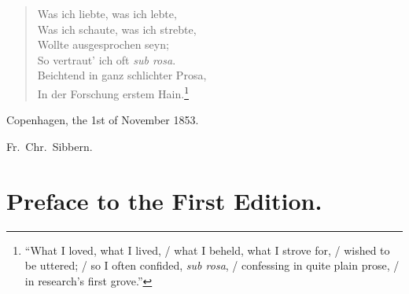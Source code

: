 \documentclass[12pt,a4paper]{book}
\begin{document}
\begin{verse}
Was ich liebte, was ich lebte,\\
Was ich schaute, was ich strebte,\\
Wollte ausgesprochen seyn;\\
So vertraut' ich oft \textit{sub rosa}.\\
Beichtend in ganz schlichter Prosa,\\
In der Forschung erstem Hain.\footnote{``What I loved, what I lived,
/ what I beheld, what I strove for, / wished to be uttered; / so I often
confided, \textit{sub rosa}, / confessing in quite plain prose, / in
research's first grove.''}
\end{verse}

\noindent Copenhagen, the 1st of November 1853.
\begin{flushright}
Fr.\ Chr.\ Sibbern.
\end{flushright}

\chapter*{Preface to the First Edition.}
\end{document}

